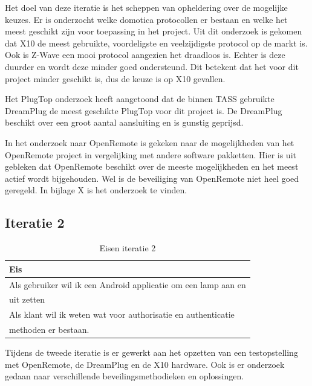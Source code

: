 \documentclass[]{article}
\begin{document}
Het doel van deze iteratie is het scheppen van opheldering over de mogelijke
keuzes. Er is onderzocht welke domotica protocollen er bestaan en welke het
meest geschikt zijn voor toepassing in het project. Uit dit onderzoek is gekomen
dat X10 de meest gebruikte, voordeligste en veelzijdigste protocol op de markt
is. Ook is Z-Wave een mooi protocol aangezien het draadloos is. Echter is deze
duurder en wordt deze minder goed ondersteund. Dit betekent dat het voor dit
project minder geschikt is, dus de keuze is op X10 gevallen.  

Het PlugTop onderzoek heeft aangetoond dat de binnen TASS gebruikte
DreamPlug de meest geschikte PlugTop voor dit project is. De DreamPlug
beschikt over een groot aantal aansluiting en is gunstig geprijsd. 

In het onderzoek naar OpenRemote is gekeken naar de mogelijkheden van het
OpenRemote project in vergelijking met andere software pakketten. Hier is uit
gebleken dat OpenRemote beschikt over de meeste mogelijkheden en het meest
actief wordt bijgehouden. Wel is de beveiliging van OpenRemote niet heel
goed geregeld. In bijlage X is het onderzoek te vinden.

\subsection{Iteratie 2}
\begin{table}[htpb]
  \caption{Eisen iteratie 2}
  \begin{center}
    \begin{tabular}{|| l ||}\hline
        Eis                                                              \\\hline\hline
        Als gebruiker wil ik een Android applicatie om een lamp aan en   \\ 
        uit zetten                                                       \\\hline
        Als klant wil ik weten wat voor authorisatie en authenticatie    \\
        methoden er bestaan.                                             \\\hline
    \end{tabular}
  \end{center}
\end{table}

Tijdens de tweede iteratie is er gewerkt aan het opzetten van een
testopstelling met OpenRemote, de DreamPlug en de X10 hardware. Ook is er
onderzoek gedaan naar verschillende beveilingsmethodieken en oplossingen.
\end{document}
